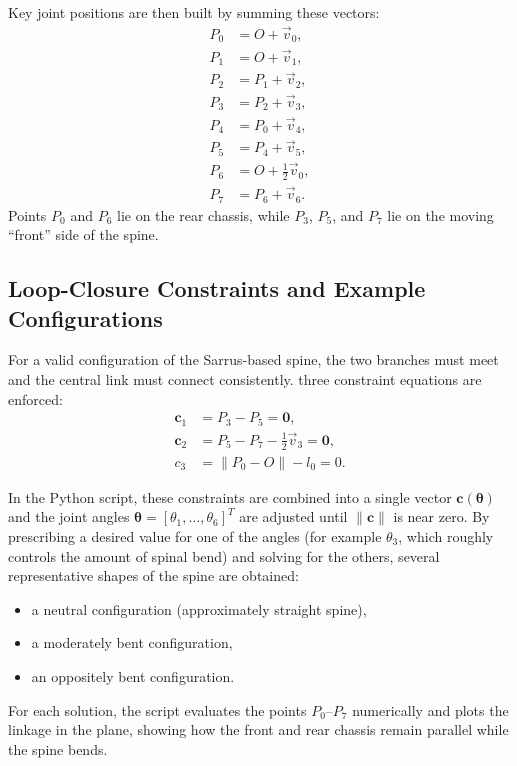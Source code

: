 \documentclass[11pt,letterpaper]{article}
\begin{document}
Key joint positions are then built by summing these vectors:
\begin{align}
    P_0 &= O + \vec{v}_0, \\
    P_1 &= O + \vec{v}_1, \\
    P_2 &= P_1 + \vec{v}_2, \\
    P_3 &= P_2 + \vec{v}_3, \\
    P_4 &= P_0 + \vec{v}_4, \\
    P_5 &= P_4 + \vec{v}_5, \\
    P_6 &= O + \tfrac{1}{2}\vec{v}_0, \\
    P_7 &= P_6 + \vec{v}_6.
\end{align}
Points $P_0$ and $P_6$ lie on the rear chassis, while $P_3$, $P_5$, and $P_7$
lie on the moving ``front'' side of the spine.

\subsection{Loop-Closure Constraints and Example Configurations}

For a valid configuration of the Sarrus-based spine, the two branches must
meet and the central link must connect consistently. three constraint equations
are enforced:
\begin{align}
    \mathbf{c}_1 &= P_3 - P_5 = \mathbf{0}, \\
    \mathbf{c}_2 &= P_5 - P_7 - \tfrac{1}{2}\vec{v}_3 = \mathbf{0}, \\
    c_3 &= \|P_0 - O\| - l_0 = 0.
\end{align}

In the Python script, these constraints are combined into a single vector
$\mathbf{c}(\boldsymbol{\theta})$ and the joint angles
$\boldsymbol{\theta} = [\theta_1,\dots,\theta_6]^T$ are adjusted until
$\|\mathbf{c}\|$ is near zero. By prescribing a desired value for one of the
angles (for example $\theta_3$, which roughly controls the amount of spinal
bend) and solving for the others, several representative shapes of the spine
are obtained:
\begin{itemize}
    \item a neutral configuration (approximately straight spine),
    \item a moderately bent configuration,
    \item an oppositely bent configuration.
\end{itemize}
For each solution, the script evaluates the points $P_0$–$P_7$ numerically and
plots the linkage in the plane, showing how the front and rear chassis remain
parallel while the spine bends.
\end{document}
